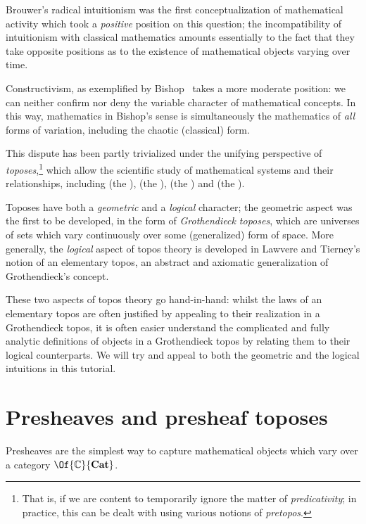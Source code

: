 \documentclass{article}
\newcommand\Cats{\mathbf{Cat}}
\begin{document}
Brouwer's radical intuitionism was the first conceptualization of
mathematical activity which took a \emph{positive} position on this
question; the incompatibility of intuitionism with classical
mathematics amounts essentially to the fact that they take opposite
positions as to the existence of mathematical objects varying over
time.

Constructivism, as exemplified by Bishop~\cite{bishop:1967} takes a
more moderate position: we can neither confirm nor deny the variable
character of mathematical concepts. In this way, mathematics in
Bishop's sense is simultaneously the mathematics of \emph{all} forms
of variation, including the chaotic (classical) form.

This dispute has been partly trivialized under the unifying
perspective of \emph{toposes},\footnote{That is, if we are content to
  temporarily ignore the matter of \emph{predicativity}; in practice,
  this can be dealt with using various notions of \emph{pretopos}.}
which allow the scientific study of mathematical systems and their
relationships, including  (the ),  (the ),  (the ) and  (the
).

Toposes have both a \emph{geometric} and a \emph{logical} character;
the geometric aspect was the first to be developed, in the form of
\emph{Grothendieck toposes}, which are universes of sets which vary
continuously over some (generalized) form of space. More generally,
the \emph{logical} aspect of topos theory is developed in Lawvere and
Tierney's notion of an elementary topos, an abstract and axiomatic
generalization of Grothendieck's concept.

These two aspects of topos theory go hand-in-hand: whilst the laws of
an elementary topos are often justified by appealing to their
realization in a Grothendieck topos, it is often easier understand the
complicated and fully analytic definitions of objects in a
Grothendieck topos by relating them to their logical counterparts. We
will try and appeal to both the geometric and the logical intuitions
in this tutorial.

\section{Presheaves and presheaf toposes}
Presheaves are the simplest way to capture mathematical objects which
vary over a category $\Of{\mathbb{C}}{\Cats}$.
\end{document}
